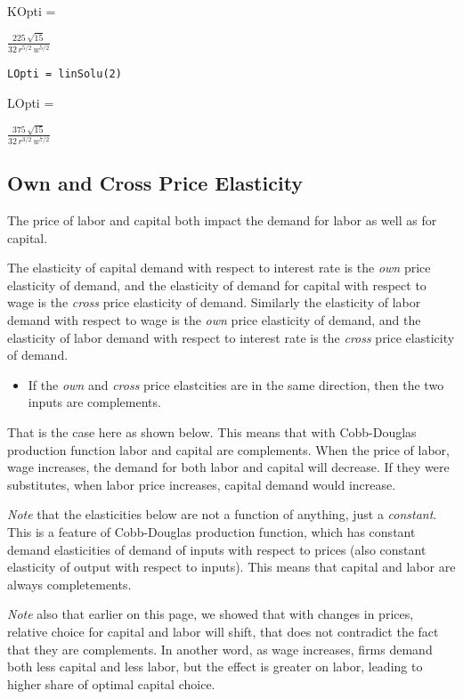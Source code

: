 \documentclass[
]{book}
\providecommand{\tightlist}{%
  \setlength{\itemsep}{0pt}\setlength{\parskip}{0pt}}
\begin{document}
KOpti =

\(\displaystyle \frac{225\,\sqrt{15}}{32\,r^{5/2} \,w^{5/2} }\)

\begin{verbatim}
LOpti = linSolu(2)
\end{verbatim}

LOpti =

\(\displaystyle \frac{375\,\sqrt{15}}{32\,r^{3/2} \,w^{7/2} }\)

\hypertarget{own-and-cross-price-elasticity}{%
\subsection{\texorpdfstring{\textbf{Own and Cross Price Elasticity}}{Own and Cross Price Elasticity}}\label{own-and-cross-price-elasticity}}

The price of labor and capital both impact the demand for labor as well
as for capital.

The elasticity of capital demand with respect to interest rate is the
\emph{own} price elasticity of demand, and the elasticity of demand for
capital with respect to wage is the \emph{cross} price elasticity of demand.
Similarly the elasticity of labor demand with respect to wage is the
\emph{own} price elasticity of demand, and the elasticity of labor demand
with respect to interest rate is the \emph{cross} price elasticity of demand.

\begin{itemize}
\tightlist
\item
  If the \emph{own} and \emph{cross} price elastcities are in the same
  direction, then the two inputs are complements.
\end{itemize}

That is the case here as shown below. This means that with Cobb-Douglas
production function labor and capital are complements. When the price of
labor, wage increases, the demand for both labor and capital will
decrease. If they were substitutes, when labor price increases, capital
demand would increase.

\emph{Note} that the elasticities below are not a function of anything, just
a \emph{constant}. This is a feature of Cobb-Douglas production function,
which has constant demand elasticities of demand of inputs with respect
to prices (also constant elasticity of output with respect to inputs).
This means that capital and labor are always completements.

\emph{Note} also that earlier on this page, we showed that with changes in
prices, relative choice for capital and labor will shift, that does not
contradict the fact that they are complements. In another word, as wage
increases, firms demand both less capital and less labor, but the effect
is greater on labor, leading to higher share of optimal capital choice.
\end{document}
